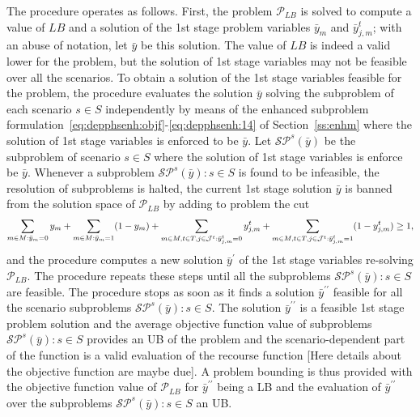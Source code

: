 \documentclass[a4paper,11pt]{article}
\begin{document}
{	The procedure operates as follows.
	First, the problem $ \mathcal{P}_{LB}$ is solved to compute a value of $ LB$ and a solution of the 1st stage problem variables $ \bar{y}_m$ and $ \bar{y}^t_{j,m}$; with an abuse of notation, let $ \bar{y}$ be this solution.
	The value of $ LB$ is indeed a valid lower for the problem, but the solution of 1st stage variables may not be feasible over all the scenarios.
	To obtain a solution of the 1st stage variables feasible for the problem, the procedure evaluates the solution $ \bar{y}$ solving the subproblem of each scenario $s \in S$ independently by means of the enhanced subproblem formulation~\ref{eq:depphsenh:objf}-\ref{eq:depphsenh:14} of Section~\ref{ss:enhm} where the solution of 1st stage variables is enforced to be $ \bar{y}$.
	Let $ \mathcal{SP}^s(\bar{y})$ be the subproblem of scenario $ s \in S$ where the solution of 1st stage variables is enforce be $ \bar{y}$.
	Whenever a subproblem $ \mathcal{SP}^s(\bar{y}) : s \in S$ is found to be infeasible, the resolution of subproblems is halted, the current 1st stage solution $ \bar{y}$ is banned from the solution space of $ \mathcal{P}_{LB}$ by adding to problem the cut
	\begin{equation}\label{eq:feascut}
		\sum\limits_{m \in M : \bar{y}_{m} = 0} y_m + \sum\limits_{m \in M : \bar{y}_{m} = 1} (1 - y_m) + 
		\sum\limits_{m \in M, t \in T, j \in {\cal J}^t : \bar{y}^t_{j,m} = 0} y^t_{j,m} + 
		\sum\limits_{m \in M, t \in T, j \in {\cal J}^t : \bar{y}^t_{j,m} = 1} (1 - y^t_{j,m}) \ge 1,
	\end{equation}
	and the procedure computes a new solution $ \bar{y}^\prime$ of the 1st stage variables re-solving $ \mathcal{P}_{LB}$.
	The procedure repeats these steps until all the subproblems $ \mathcal{SP}^s(\bar{y}) : s \in S$ are feasible.
	The procedure stops as soon as it finds a solution $ \bar{y}^{\prime\prime}$ feasible for all the scenario subproblems $\mathcal{SP}^s(\bar{y}) : s \in S$.
	The solution $ \bar{y}^{\prime\prime}$ is a feasible 1st stage problem solution and the average objective function value of subproblems $\mathcal{SP}^s(\bar{y}) : s \in S$ provides an UB of the problem and the scenario-dependent part of the function is a valid evaluation of the recourse function {\color{red} [Here details about the objective function are maybe due].}
	A problem bounding is thus provided with the objective function value of $ \mathcal{P}_{LB}$ for $ \bar{y}^{\prime\prime}$ being a LB and the evaluation of $ \bar{y}^{\prime\prime}$ over the subproblems $\mathcal{SP}^s(\bar{y}) : s \in S$ an UB.	
}
\end{document}
